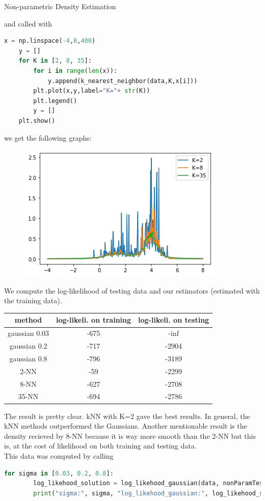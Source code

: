 \documentclass[
ngerman,
]{tudaexercise}
\begin{document}
\begin{task}{Non-parametric Density Estimation}
\begin{subtask}
	and called with 
	\begin{lstlisting}[language=Python]
	x = np.linspace(-4,8,400)
	y = []
	for K in [2, 8, 35]:
		for i in range(len(x)):
			y.append(k_nearest_neighbor(data,K,x[i]))
		plt.plot(x,y,label="K="+ str(K))
		plt.legend()
		y = []
	plt.show()
	\end{lstlisting}
	we get the following graphs:
	\begin{figure}[H]
		\includegraphics{3cplot.png}
	\end{figure}
	\end{subtask}
\begin{subtask}
	We compute the log-likelihood of testing data and our estimators (estimated with the training data). \begin{center}\begin{tabular}{||c c c||}
			\hline
			method & log-likeli. on training & log-likeli. on testing \\ [0.5ex]
			\hline \hline
			gaussian 0.03 &-675 &-inf\\
			gaussian 0.2 &-717 &-2904\\
			gaussian 0.8 &-796 &-3189\\
			2-NN &-59&-2299\\
			8-NN &-627&-2708\\
			35-NN&-694&-2786\\
		\end{tabular}
	\end{center}
	The result is pretty clear. kNN with K=2 gave the best results. In general, the kNN methods outperformed the Gaussians. Another mentionable result is the density recieved by 8-NN because it is way more smooth than the 2-NN but this is, at the cost of likelihood on both training and testing data.\\
	This data was computed by calling
	\begin{lstlisting}[language=Python]
	for sigma in [0.03, 0.2, 0.8]:
		log_likehood_solution = log_likehood_gaussian(data, nonParamTest , sigma)
		print("sigma:", sigma, "log_likehood_gaussian:", log_likehood_solution)
	

\end{lstlisting}
\end{subtask}
\end{task}
\end{document}
